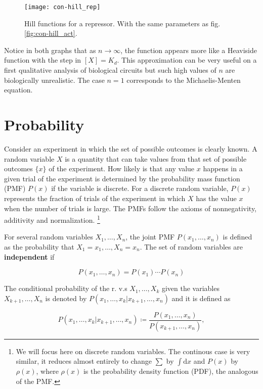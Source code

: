 \begin{figure}[H]
  \centering
  \texttt{[image: con-hill\_rep]}
  \caption[Hill function for a repressor]{\label{fig:con-hill_rep} Hill functions for a repressor. With the same parameters as fig. \ref{fig:con-hill_act}.}
\end{figure}

Notice in both graphs that as $n\rightarrow\infty$, the function appears more like a Heaviside function with the step in $[X] = K_d$. This approximation can be very useful on a first qualitative analysis of biological circuits but such high values of $n$ are biologically unrealistic. The case $n=1$ corresponds to the Michaelis-Menten equation.

\section{Probability}

Consider an experiment in which the set of possible outcomes is clearly known. A random variable $X$ is a quantity that can take values from that set of possible outcomes $\{x\}$ of the experiment. How likely is that any value $x$ happens in a given trial of the experiment is determined by the probability mass function (PMF) $P(x)$ if the variable is discrete. For a discrete random variable, $P(x)$ represents the fraction of trials of the experiment in which $X$ has the value $x$ when the number of trials is large. The PMFs follow the axioms of nonnegativity, additivity and normalization. \cite{bertsekas08} \footnote{We will focus here on discrete random variables. The continous case is very similar, it reduces almost entirely to change $\sum$ by $\int\mathrm{d}x$ and $P(x)$ by $\rho(x)$, where $\rho(x)$ is the probability density function (PDF), the analogous of the PMF.} 

For several random variables $X_1,\dotsc,X_n$, the joint PMF  $P(x_1,\dotsc,x_n)$ is defined as the probability that $X_1=x_1,\dotsc,X_n=x_n$. The set of random variables are \textbf{independent} if

\begin{equation*}
  P(x_1,\dotsc,x_n) = P(x_1)\dotsm P(x_n)
\end{equation*}

The conditional probability of the r. v.s $X_1,\dotsc,X_k$ given the variables $X_{k+1},\dotsc,X_n$ is denoted by $P(x_1,\dotsc,x_k|x_{k+1},\dotsc,x_n)$ and it is defined as

\begin{equation*}
  P(x_1,\dotsc,x_k|x_{k+1},\dotsc,x_n) \coloneqq \frac{P(x_1,\dotsc,x_n)}{P(x_{k+1},\dotsc,x_n)},
\end{equation*}

